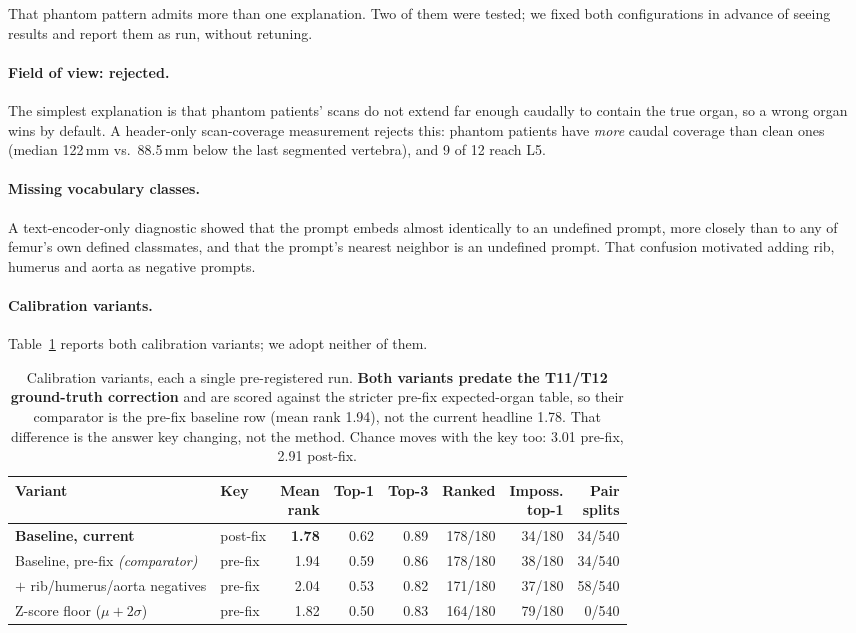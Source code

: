 That phantom pattern admits more than one explanation. Two of them were tested;
we fixed both configurations in advance of seeing results and report them as
run, without retuning.

\paragraph{Field of view: rejected.}
The simplest explanation is that phantom patients' scans do not extend far
enough caudally to contain the true organ, so a wrong organ wins by default. A
header-only scan-coverage measurement rejects this: phantom patients have
\emph{more} caudal coverage than clean ones (median 122\,mm vs.\ 88.5\,mm below
the last segmented vertebra), and 9 of 12 reach L5.

\paragraph{Missing vocabulary classes.}
A text-encoder-only diagnostic showed that the  prompt embeds
almost identically to an undefined  prompt, more closely than to
any of femur's own defined classmates, and that the  prompt's
nearest neighbor is an undefined  prompt. That confusion motivated
adding rib, humerus and aorta as negative prompts.

\paragraph{Calibration variants.}
Table~\ref{tab:variants} reports both calibration variants; we adopt neither of
them.

\begin{table}[t]
\centering
\small
\caption{Calibration variants, each a single pre-registered run.
\textbf{Both variants predate the T11/T12 ground-truth correction} and are
scored against the stricter pre-fix expected-organ table, so their comparator is
the pre-fix baseline row (mean rank 1.94), not the current headline 1.78. That
difference is the answer key changing, not the method. Chance moves with the key
too: 3.01 pre-fix, 2.91 post-fix.}
\label{tab:variants}
\begin{tabular}{@{}llrrrrrr@{}}
\toprule
Variant & Key & \makecell{Mean\\rank} & Top-1 & Top-3 & Ranked & \makecell{Imposs.\\top-1} & \makecell{Pair\\splits} \\
\midrule
\textbf{Baseline, current} & post-fix & \textbf{1.78} & 0.62 & 0.89 & 178/180 & 34/180 & 34/540 \\
Baseline, pre-fix \emph{(comparator)} & pre-fix & 1.94 & 0.59 & 0.86 & 178/180 & 38/180 & 34/540 \\
$+$ rib/humerus/aorta negatives & pre-fix & 2.04 & 0.53 & 0.82 & 171/180 & 37/180 & 58/540 \\
Z-score floor ($\mu + 2\sigma$) & pre-fix & 1.82 & 0.50 & 0.83 & 164/180 & 79/180 & 0/540 \\
\bottomrule
\end{tabular}
\end{table}

